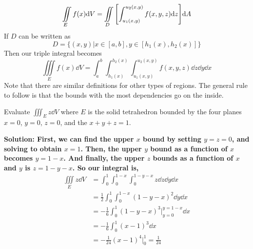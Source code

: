 \[ \iint\limits_E f(x)\dd V = \iint\limits_D \bqty{\int_{u_1(x,y)}^{u_2(x,y)}f(x,y,z)\dd z}\dd A \]
If $D$ can be written as 
\[ D = \{(x,y)|x\in[a,b], y\in[h_1(x), h_2(x)]\} \]
Then our triple integral becomes 
\[ \iiint\limits_E f(x)\dd V = \int_a^b\int_{h_1(x)}^{h_2(x)}\int_{u_1(x,y)}^{u_2(x,y)}f(x,y,z)\dd z\dd y\dd x \]
Note that there are similar definitions for other types of regions. The general rule to follow is that the bounds with the most dependencies go on the inside.
\begin{example}
    Evaluate $\iiint_E z\dd V$ where $E$ is the solid tetrahedron bounded by the four planes $x=0$, $y=0$, $z=0$, and the $x+y+z=1$. \par
    \bf{Solution: }First, we can find the upper $x$ bound by setting $y=z=0$, and solving to obtain $x = 1$. Then, the upper $y$ bound as a function of $x$ becomes $y=1-x$. And finally, the upper $z$ bounds as a function of $x$ and $y$ is $z=1-y-x$. So our integral is,
    \begin{align}
        \iiint\limits_E z\dd V &= \int_0^1\int_0^{1-x}\int_0^{1-y-x}z\dd z\dd y\dd x \\
        &= \frac{1}{2}\int_0^1\int_0^{1-x} (1-y-x)^2\dd y\dd x \\
        &= -\frac{1}{6}\int_0^1 (1-y-x)^3\biggr|_{y=0}^{y=1-x} \dd x \\
        &=  -\frac{1}{6}\int_0^1 (x-1)^3\dd x \\
        &= -\frac{1}{24}(x-1)^4\biggr|_0^1 = \boxed{\frac{1}{24}}
    \end{align}
\end{example}

